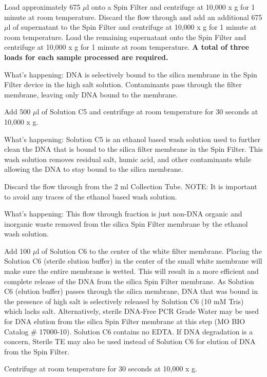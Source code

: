\documentclass[12pt]{../SOP3_alpha}
\begin{document}
\NP Load approximately 675 $\mu$l onto a Spin Filter and centrifuge at 10,000 x g for 1 minute at room temperature. Discard the flow through and add an additional 675 $\mu$l of supernatant to the Spin Filter and centrifuge at 10,000 x g for 1 minute at room temperature. Load the remaining supernatant onto the Spin Filter and centrifuge at 10,000 x g for 1 minute at room temperature. \textbf{A total of three loads for each sample processed are required.}

\noindent What's happening: DNA is selectively bound to the silica membrane in the Spin Filter device in the high salt solution. Contaminants pass through the
filter membrane, leaving only DNA bound to the membrane.

\NP Add 500 $\mu$l of Solution C5 and centrifuge at room temperature for 30 seconds at 10,000 x g.

\noindent What's happening: Solution C5 is an ethanol based wash solution used to further clean the DNA that is bound to the silica filter membrane in the Spin Filter. This wash solution removes residual salt, humic acid, and other contaminants while allowing the DNA to stay bound to the silica membrane.

\NP Discard the flow through from the 2 ml Collection Tube. NOTE: It is important to avoid any traces of the ethanol based wash solution.

\noindent What's happening: This flow through fraction is just non-DNA organic and inorganic waste removed from the silica Spin Filter membrane by the ethanol wash solution.


\NP Add 100 $\mu$l of Solution C6 to the center of the white filter membrane. Placing the Solution C6 (sterile elution buffer) in the center of the small white membrane will make sure the entire membrane is wetted. This will result in a more efficient and complete release of the DNA from the silica Spin Filter membrane. As Solution C6 (elution buffer) passes through the silica membrane, DNA that was bound in the presence of high salt is selectively released by Solution C6 (10 mM Tris) which lacks salt. Alternatively, sterile DNA-Free PCR Grade Water may be used for DNA elution from the silica Spin Filter membrane at this step (MO BIO Catalog \# 17000-10). Solution C6 contains no EDTA. If DNA degradation is a concern, Sterile TE may also be used instead of Solution C6 for elution of DNA from the Spin Filter.


\NP Centrifuge at room temperature for 30 seconds at 10,000 x g.
\end{document}
